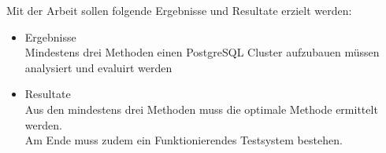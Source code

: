 Mit der Arbeit sollen folgende Ergebnisse und Resultate erzielt werden:
\begin{itemize}
    \item Ergebnisse \\ Mindestens drei Methoden einen \Gls{PostgreSQL Cluster} aufzubauen müssen analysiert und evaluirt werden
    \item Resultate \\ Aus den mindestens drei Methoden muss die optimale Methode ermittelt werden. \\ Am Ende muss zudem ein Funktionierendes Testsystem bestehen.
\end{itemize}

